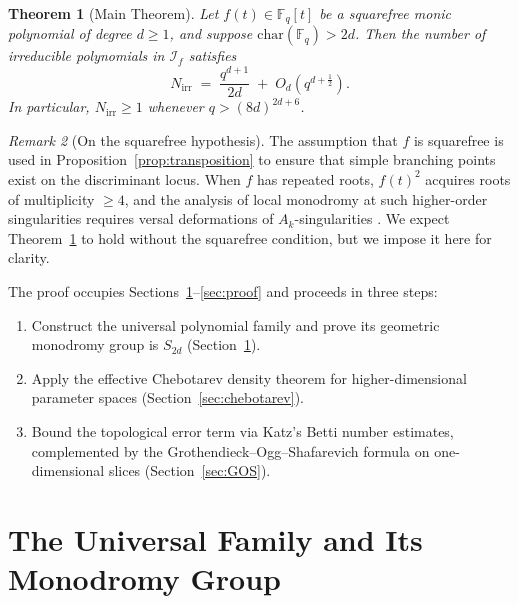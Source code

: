 \documentclass[11pt, a4paper]{article}
\newtheorem{theorem}{Theorem}[section]
\theoremstyle{definition}
\theoremstyle{remark}
\newtheorem{remark}[theorem]{Remark}
\newcommand{\Fq}{\mathbb{F}_q}
\begin{document}
\begin{theorem}[Main Theorem]\label{thm:main}
Let $f(t) \in \Fq[t]$ be a squarefree monic polynomial of degree
$d \ge 1$, and suppose $\mathrm{char}(\Fq) > 2d$.
Then the number of irreducible polynomials in $\mathcal{I}_f$
satisfies
\begin{equation}\label{eq:main_asymptotic}
    N_{\mathrm{irr}}
    \;=\;
    \frac{q^{d+1}}{2d}
    \;+\;
    O_d\!\left(q^{d+\frac{1}{2}}\right).
\end{equation}
In particular, $N_{\mathrm{irr}} \ge 1$ whenever
$q > (8d)^{2d+6}$.
\end{theorem}

\begin{remark}[On the squarefree hypothesis]\label{rem:sqfree}
The assumption that $f$ is squarefree is used in
Proposition~\ref{prop:transposition}
to ensure that simple branching points
exist on the discriminant locus.
When $f$ has repeated roots, $f(t)^2$ acquires roots of multiplicity
$\ge 4$, and the analysis of local monodromy at such higher-order
singularities requires versal deformations of
$A_k$-singularities \cite{AGLV1993}.
We expect Theorem~\ref{thm:main} to hold without the squarefree
condition, but we impose it here for clarity.
\end{remark}

The proof occupies Sections~\ref{sec:monodromy}--\ref{sec:proof}
and proceeds in three steps:
\begin{enumerate}[nosep, label=(\roman*)]
\item Construct the universal polynomial family and prove its
      geometric monodromy group is $S_{2d}$
      (Section~\ref{sec:monodromy}).
\item Apply the effective Chebotarev density theorem for
      higher-dimensional parameter spaces
      (Section~\ref{sec:chebotarev}).
\item Bound the topological error term via Katz's Betti number
      estimates, complemented by the Grothendieck--Ogg--Shafarevich
      formula on one-dimensional slices (Section~\ref{sec:GOS}).
\end{enumerate}

\section{The Universal Family and Its Monodromy Group}
\label{sec:monodromy}
\end{document}
